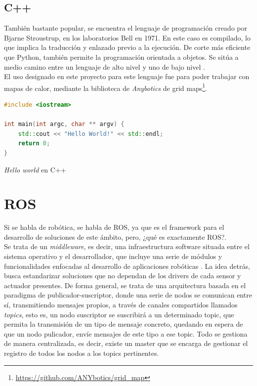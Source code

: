 \subsection{C++}
\label{subsec:cplusplus}

También bastante popular, se encuentra el lenguaje de programación creado por Bjarne Stroustrup, en los laboratorios Bell en 1971. En este caso es compilado, lo que implica la traducción y enlazado previo a la ejecución. De corte más eficiente que Python, también permite la programación orientada a objetos. Se sitúa a medio camino entre un lenguaje de alto nivel y uno de bajo nivel \cite{c-history}.\\

El uso designado en este proyecto para este lenguaje fue para poder trabajar con mapas de calor, mediante la biblioteca de \emph{Anybotics} de grid maps\footnote[1]{\url{https://github.com/ANYbotics/grid_map}}.

\begin{code}[H]
\begin{lstlisting}[language=C++]
#include <iostream>

int main(int argc, char ** argv) {
    std::cout << "Hello World!" << std::endl;
    return 0;
}
\end{lstlisting}
\caption[Hello world en C++]{\emph{Hello world} en C++}
\label{cod:helloworld_cplusplus}
\end{code}

\section{\ac{ROS}}
\label{sec:ros}

Si se habla de robótica, se habla de \ac{ROS}, ya que es el framework para el desarrollo de soluciones de este ámbito, pero, ¿qué es exactamente \ac{ROS}?.\\

Se trata de un \emph{middleware}, es decir, una infraestructura software situada entre el sistema operativo y el desarrollador, que incluye una serie de módulos y funcionalidades enfocadas al desarrollo de aplicaciones robóticas \cite{middleware-def} \cite{ros-def}. La idea detrás, busca estandarizar soluciones que no dependan de los drivers de cada sensor y actuador presentes. De forma general, se trata de una arquitectura basada en el paradigma de publicador-suscriptor, donde una serie de nodos se comunican entre sí, transmitiendo mensajes propios, a través de canales compartidos llamados \emph{topics}, esto es, un nodo suscriptor se suscribirá a un determinado topic, que permita la transmisión de un tipo de mensaje concreto, quedando en espera de que un nodo pulicador, envíe mensajes de este tipo a ese topic. Todo se gestiona de manera centralizada, es decir, existe un master que se encarga de gestionar el registro de todos los nodos a los topics pertinentes.\\

